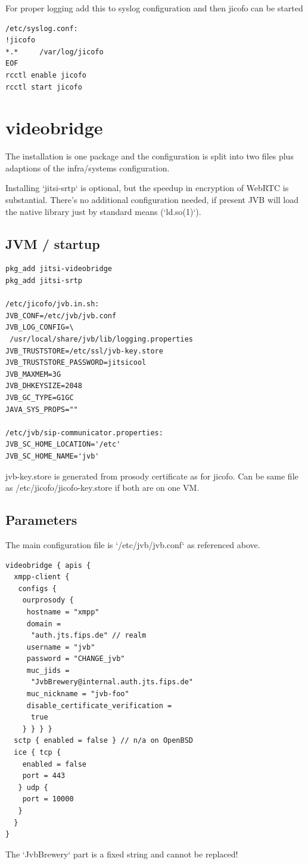 \documentclass[10pt,conference]{IEEEtran}
\begin{document}
For proper logging add this to syslog configuration and then jicofo can be started
\begin{verbatim}
/etc/syslog.conf:
!jicofo
*.*     /var/log/jicofo
EOF
rcctl enable jicofo
rcctl start jicofo
\end{verbatim}

\section{videobridge}
The installation is one package and the configuration is split into two files plus
adaptions of the infra/systems configuration.

Installing `jitsi-srtp` is optional, but the speedup in encryption of WebRTC is substantial.
There's no additional configuration needed, if present JVB will load the native library just by
standard means (`ld.so(1)`).

\subsection{JVM / startup}

\begin{verbatim}
pkg_add jitsi-videobridge
pkg_add jitsi-srtp

/etc/jicofo/jvb.in.sh:
JVB_CONF=/etc/jvb/jvb.conf
JVB_LOG_CONFIG=\
 /usr/local/share/jvb/lib/logging.properties
JVB_TRUSTSTORE=/etc/ssl/jvb-key.store
JVB_TRUSTSTORE_PASSWORD=jitsicool
JVB_MAXMEM=3G
JVB_DHKEYSIZE=2048
JVB_GC_TYPE=G1GC
JAVA_SYS_PROPS=""

/etc/jvb/sip-communicator.properties:
JVB_SC_HOME_LOCATION='/etc'
JVB_SC_HOME_NAME='jvb'
\end{verbatim}
jvb-key.store is generated from prosody certificate as for jicofo. Can be same file
as /etc/jicofo/jicofo-key.store if both are on one VM.
\subsection{Parameters}
The main configuration file is `/etc/jvb/jvb.conf` as referenced above.
\begin{verbatim}
videobridge { apis {
  xmpp-client {
   configs {
    ourprosody {
     hostname = "xmpp"
     domain =
      "auth.jts.fips.de" // realm
     username = "jvb"
     password = "CHANGE_jvb"
     muc_jids =
      "JvbBrewery@internal.auth.jts.fips.de"
     muc_nickname = "jvb-foo"
     disable_certificate_verification =
      true
    } } } }
  sctp { enabled = false } // n/a on OpenBSD
  ice { tcp {
    enabled = false
    port = 443
   } udp {
    port = 10000
   }
  }
}
\end{verbatim}
The `JvbBrewery` part is a fixed string and cannot be replaced!
\end{document}
